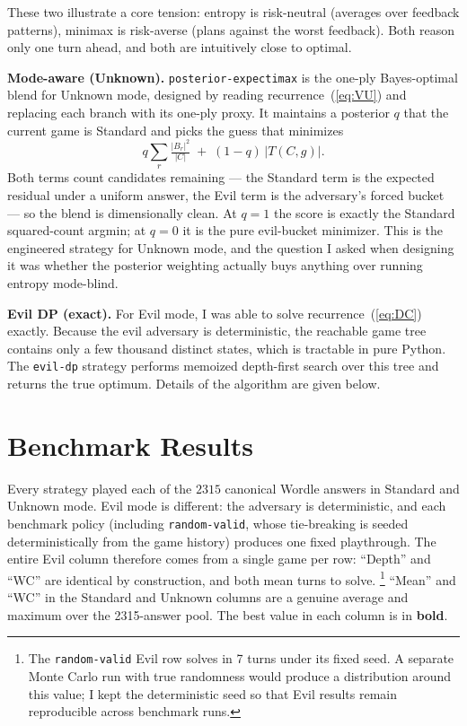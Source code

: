\documentclass[11pt]{article}
\newcommand{\evilT}{T}
\begin{document}
These two illustrate a core tension: entropy is risk-neutral
(averages over feedback patterns), minimax is risk-averse (plans
against the worst feedback). Both reason only one turn ahead, and
both are intuitively close to optimal.

\textbf{Mode-aware (Unknown).} \texttt{posterior-expectimax} is the
one-ply Bayes-optimal blend for Unknown mode, designed by reading
recurrence~(\ref{eq:VU}) and replacing each branch with its one-ply
proxy. It maintains a posterior $q$ that the current game is Standard
and picks the guess that minimizes
\[
  q\sum_r \tfrac{|B_r|^2}{|C|} \;+\; (1-q)\,|\evilT(C, g)|.
\]
Both terms count candidates remaining --- the Standard term is the
expected residual under a uniform answer, the Evil term is the
adversary's forced bucket --- so the blend is dimensionally clean.
At $q=1$ the score is exactly the Standard squared-count argmin; at
$q=0$ it is the pure evil-bucket minimizer. This is the engineered
strategy for Unknown mode, and the question I asked when designing
it was whether the posterior weighting actually buys anything over
running entropy mode-blind.

\textbf{Evil DP (exact).} For Evil mode, I was able to solve
recurrence~(\ref{eq:DC}) exactly. Because the evil adversary is
deterministic, the reachable game tree contains only a few thousand
distinct states, which is tractable in pure Python. The
\texttt{evil-dp} strategy performs memoized depth-first search over
this tree and returns the true optimum. Details of the algorithm are
given below.

\section*{Benchmark Results}

Every strategy played each of the $\num{2315}$ canonical Wordle answers
in Standard and Unknown mode. Evil mode is different: the adversary is
deterministic, and each benchmark policy (including
\texttt{random-valid}, whose tie-breaking is seeded deterministically
from the game history) produces one fixed playthrough. The entire Evil
column therefore comes from a single game per row: ``Depth'' and
``WC'' are identical by construction, and both mean turns to solve.
\footnote{The \texttt{random-valid} Evil row solves
in 7 turns under its fixed seed. A separate Monte Carlo run with true
randomness would produce a distribution around this value; I kept the
deterministic seed so that Evil results remain reproducible across
benchmark runs.} ``Mean'' and ``WC'' in the Standard and Unknown
columns are a genuine average and maximum over the 2315-answer pool.
The best value in each column is in \textbf{bold}.
\end{document}

